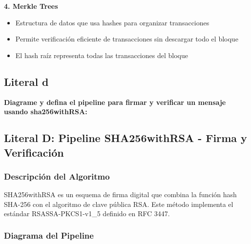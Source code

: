 {\textbf{4. Merkle Trees}
\begin{itemize}
    \item Estructura de datos que usa hashes para organizar transacciones
    \item Permite verificación eficiente de transacciones sin descargar todo el bloque
    \item El hash raíz representa todas las transacciones del bloque
\end{itemize}




\subsection{Literal d}
\textbf{Diagrame y defina el pipeline para firmar y verificar un mensaje usando
sha256withRSA:}

\subsection{Literal D: Pipeline SHA256withRSA - Firma y Verificación}

\subsubsection{Descripción del Algoritmo}

SHA256withRSA es un esquema de firma digital que combina la función hash SHA-256 con el algoritmo de clave pública RSA. Este método implementa el estándar RSASSA-PKCS1-v1\_5 definido en RFC 3447.

\subsubsection{Diagrama del Pipeline}

\begin{figure}[h]
\centering
{}
\end{figure}}
